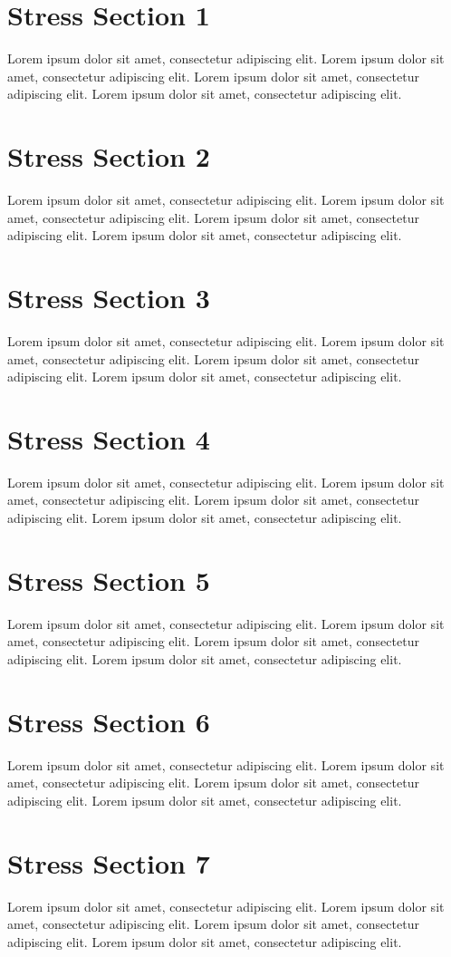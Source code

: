 \documentclass{article}
\begin{document}
\section{Stress Section 1}
Lorem ipsum dolor sit amet, consectetur adipiscing elit. Lorem ipsum dolor sit amet, consectetur adipiscing elit. Lorem ipsum dolor sit amet, consectetur adipiscing elit. Lorem ipsum dolor sit amet, consectetur adipiscing elit. \newpage
\section{Stress Section 2}
Lorem ipsum dolor sit amet, consectetur adipiscing elit. Lorem ipsum dolor sit amet, consectetur adipiscing elit. Lorem ipsum dolor sit amet, consectetur adipiscing elit. Lorem ipsum dolor sit amet, consectetur adipiscing elit. \newpage
\section{Stress Section 3}
Lorem ipsum dolor sit amet, consectetur adipiscing elit. Lorem ipsum dolor sit amet, consectetur adipiscing elit. Lorem ipsum dolor sit amet, consectetur adipiscing elit. Lorem ipsum dolor sit amet, consectetur adipiscing elit. \newpage
\section{Stress Section 4}
Lorem ipsum dolor sit amet, consectetur adipiscing elit. Lorem ipsum dolor sit amet, consectetur adipiscing elit. Lorem ipsum dolor sit amet, consectetur adipiscing elit. Lorem ipsum dolor sit amet, consectetur adipiscing elit. \newpage
\section{Stress Section 5}
Lorem ipsum dolor sit amet, consectetur adipiscing elit. Lorem ipsum dolor sit amet, consectetur adipiscing elit. Lorem ipsum dolor sit amet, consectetur adipiscing elit. Lorem ipsum dolor sit amet, consectetur adipiscing elit. \newpage
\section{Stress Section 6}
Lorem ipsum dolor sit amet, consectetur adipiscing elit. Lorem ipsum dolor sit amet, consectetur adipiscing elit. Lorem ipsum dolor sit amet, consectetur adipiscing elit. Lorem ipsum dolor sit amet, consectetur adipiscing elit. \newpage
\section{Stress Section 7}
Lorem ipsum dolor sit amet, consectetur adipiscing elit. Lorem ipsum dolor sit amet, consectetur adipiscing elit. Lorem ipsum dolor sit amet, consectetur adipiscing elit. Lorem ipsum dolor sit amet, consectetur adipiscing elit. \newpage
\end{document}
